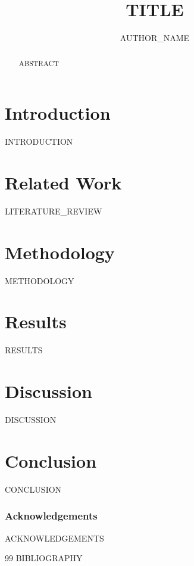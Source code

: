 \documentclass[runningheads]{llncs}
\begin{document}
\title{{{TITLE}}}

\author{{{AUTHOR_NAME}}}


\maketitle

\begin{abstract}
{{ABSTRACT}}
\end{abstract}

\section{Introduction}
{{INTRODUCTION}}

\section{Related Work}
{{LITERATURE_REVIEW}}

\section{Methodology}
{{METHODOLOGY}}

\section{Results}
{{RESULTS}}

\section{Discussion}
{{DISCUSSION}}

\section{Conclusion}
{{CONCLUSION}}

\subsubsection*{Acknowledgements}
{{ACKNOWLEDGEMENTS}}

\begin{thebibliography}{99}
{{BIBLIOGRAPHY}}
\end{thebibliography}
\end{document}
